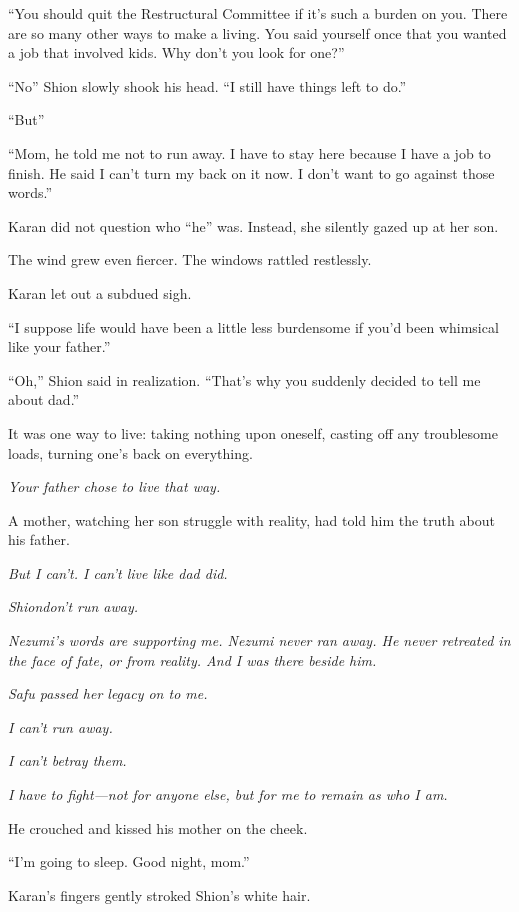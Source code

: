 ``You should quit the Restructural Committee if it's such a burden on
you. There are so many other ways to make a living. You said yourself
once that you wanted a job that involved kids. Why don't you look for
one?''

``No\el '' Shion slowly shook his head. ``I still have things left to
do.''

``But\el ''

``Mom, he told me not to run away. I have to stay here because I have a
job to finish. He said I can't turn my back on it now. I don't want to
go against those words.''

Karan did not question who ``he'' was. Instead, she silently gazed up at
her son.

The wind grew even fiercer. The windows rattled restlessly.

Karan let out a subdued sigh.

\mybreak

``I suppose life would have been a little less burdensome if you'd been
whimsical like your father.''

``Oh,'' Shion said in realization. ``That's why you suddenly decided to
tell me about dad.''

It was one way to live: taking nothing upon oneself, casting off any
troublesome loads, turning one's back on everything.

\emph{Your father chose to live that way.}

A mother, watching her son struggle with reality, had told him the truth
about his father.

\emph{But I can't. I can't live like dad did.}

\myspace

\emph{Shion\el don't run away.}

\myspace

\emph{Nezumi's words are supporting me. Nezumi never ran away. He never
retreated in the face of fate, or from reality. And I was there beside
him.}

\emph{Safu passed her legacy on to me.}

\emph{I can't run away.}

\emph{I can't betray them.}

\emph{I have to fight---not for anyone else, but for me to remain as who I am.}

He crouched and kissed his mother on the cheek.

``I'm going to sleep. Good night, mom.''

Karan's fingers gently stroked Shion's white hair.


